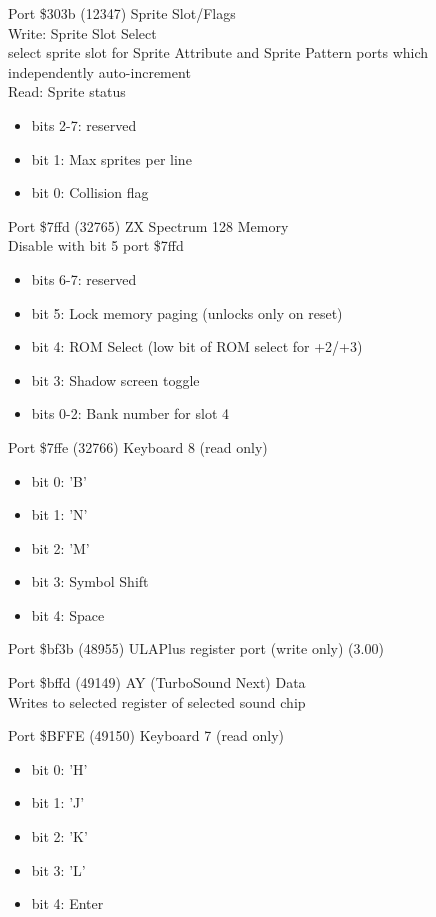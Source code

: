Port \$303b (12347) Sprite Slot/Flags\\
Write: Sprite Slot Select\\
select sprite slot for Sprite Attribute and Sprite Pattern ports which
independently auto-increment\\
Read: Sprite status
\begin{itemize}
\item[] bits 2-7: reserved
\item[] bit 1: Max sprites per line
\item[] bit 0: Collision flag
\end{itemize}

Port \$7ffd (32765) ZX Spectrum 128 Memory\\
Disable with bit 5 port \$7ffd
\begin{itemize}
\item[] bits 6-7: reserved
\item[] bit 5: Lock memory paging (unlocks only on reset)
\item[] bit 4: ROM Select (low bit of ROM select for +2/+3)
\item[] bit 3: Shadow screen toggle
\item[] bits 0-2: Bank number for slot 4
\end{itemize}

Port \$7ffe (32766) Keyboard 8 (read only)
\begin{itemize}
\item[] bit 0: 'B'
\item[] bit 1: 'N'
\item[] bit 2: 'M'
\item[] bit 3: Symbol Shift
\item[] bit 4: Space
\end{itemize}

Port \$bf3b (48955) ULAPlus register port (write only) (3.00)

Port \$bffd (49149) AY (TurboSound Next) Data\\
Writes to selected register of selected sound chip

Port \$BFFE (49150) Keyboard 7 (read only)
\begin{itemize}
\item[] bit 0: 'H'
\item[] bit 1: 'J'
\item[] bit 2: 'K'
\item[] bit 3: 'L'
\item[] bit 4: Enter
\end{itemize}

